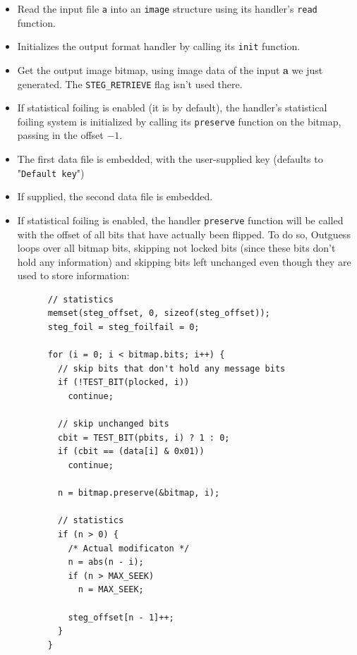 \documentclass{article}
\begin{document}
\begin{itemize}
	\item Read the input file \texttt{a} into an \texttt{image} structure using its handler's \texttt{read} function.
	
	\item Initializes the output format handler by calling its \texttt{init} function.
	
	\item Get the output image bitmap, using image data of the input \textbf{a} we just generated. The \texttt{STEG\_RETRIEVE} flag isn't used there.

	\item If statistical foiling is enabled (it is by default), the handler's statistical foiling system is initialized by calling its \texttt{preserve} function on the bitmap, passing in the offset $-1$.
	
	\item The first data file is embedded, with the user-supplied key (defaults to "\texttt{Default key}")

	\item If supplied, the second data file is embedded.
	
	\item If statistical foiling is enabled, the handler \texttt{preserve} function will be called with the offset of all bits that have actually been flipped. To do so, Outguess loops over all bitmap bits, skipping not locked bits (since these bits don't hold any information) and skipping bits left unchanged even though they are used to store information:
		\begin{verbatim}
      // statistics
      memset(steg_offset, 0, sizeof(steg_offset));
      steg_foil = steg_foilfail = 0;

      for (i = 0; i < bitmap.bits; i++) {
        // skip bits that don't hold any message bits
        if (!TEST_BIT(plocked, i))
          continue;
       	
        // skip unchanged bits
        cbit = TEST_BIT(pbits, i) ? 1 : 0;
        if (cbit == (data[i] & 0x01))
          continue;
	
        n = bitmap.preserve(&bitmap, i);

        // statistics
        if (n > 0) {
          /* Actual modificaton */
          n = abs(n - i);
          if (n > MAX_SEEK)
            n = MAX_SEEK;

          steg_offset[n - 1]++;
        }
      }
		\end{verbatim}


\end{itemize}
\end{document}

